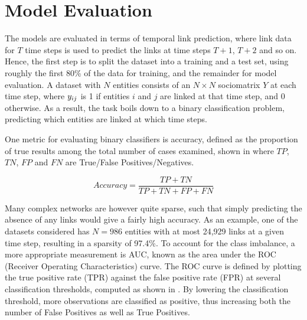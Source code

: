         
    
\section{Model Evaluation}
    
    The models are evaluated in terms of temporal link prediction, where link data for $T$ time steps is used to predict the links at time steps $T+1$, $T+2$ and so on. Hence, the first step is to split the dataset into a training and a test set, using roughly the first 80\% of the data for training, and the remainder for model evaluation. A dataset with $N$ entities consists of an $N\times N$ sociomatrix $Y$ at each time step, where $\sub(y)$ is 1 if entities $i$ and $j$ are linked at that time step, and 0 otherwise. As a result, the task boils down to a binary classification problem, predicting which entities are linked at which time steps.
    
    One metric for evaluating binary classifiers is accuracy, defined as the proportion of true results among the total number of cases examined, shown in  where $TP$, $TN$, $FP$ and $FN$ are True/False Positives/Negatives.
    
    \begin{equation}\label{eq:eval-accuracy}
        Accuracy = \frac{TP+TN}{TP+TN+FP+FN}
    \end{equation}
    
    Many complex networks are however quite sparse, such that simply predicting the absence of any links would give a fairly high accuracy. As an example, one of the datasets considered has $N=986$ entities with at most 24,929 links at a given time step, resulting in a sparsity of 97.4\%. To account for the class imbalance, a more appropriate measurement is AUC, known as the area under the ROC (Receiver Operating Characteristics) curve. The ROC curve is defined by plotting the true positive rate (TPR) against the false positive rate (FPR) at several classification thresholds, computed as shown in . By lowering the classification threshold, more observations are classified as positive, thus increasing both the number of False Positives as well as True Positives.
    
